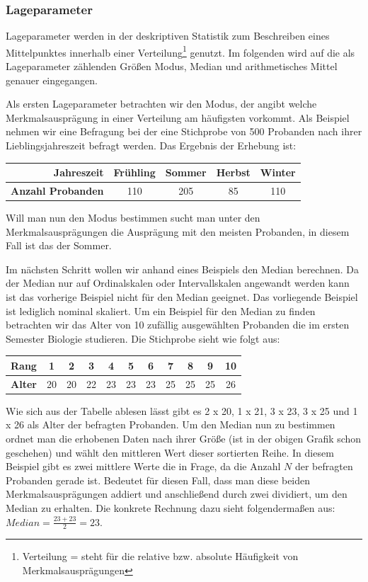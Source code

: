 \subsubsection{Lageparameter}
Lageparameter werden in der deskriptiven Statistik zum Beschreiben eines Mittelpunktes innerhalb einer Verteilung\footnote{Verteilung = steht für die relative bzw. absolute Häufigkeit von Merkmalsausprägungen} genutzt. Im folgenden wird auf die als Lageparameter zählenden Größen Modus, Median und arithmetisches Mittel genauer eingegangen.

Als ersten Lageparameter betrachten wir den Modus, der angibt welche Merkmalsausprägung in einer Verteilung am häufigsten vorkommt. Als Beispiel nehmen wir eine Befragung bei der eine Stichprobe von 500 Probanden nach ihrer Lieblingsjahreszeit befragt werden. Das Ergebnis der Erhebung ist:
\begin{center}
\begin{tabular}{r|c|c|c|c} 
\textbf{Jahreszeit} & Frühling & Sommer & Herbst & Winter \\ \hline
\textbf{Anzahl Probanden} & 110 & 205 & 85 & 110\\
\end{tabular}
\end{center}
Will man nun den Modus bestimmen sucht man unter den Merkmalsausprägungen die Ausprägung mit den meisten Probanden, in diesem Fall ist das der Sommer.

Im nächsten Schritt wollen wir anhand eines Beispiels den Median berechnen. Da der Median nur auf Ordinalskalen oder Intervallskalen angewandt werden kann ist das vorherige Beispiel nicht für den Median geeignet. Das vorliegende Beispiel ist lediglich nominal skaliert.
Um ein Beispiel für den Median zu finden betrachten wir das Alter von 10 zufällig ausgewählten Probanden die im ersten Semester Biologie studieren. Die Stichprobe sieht wie folgt aus:
\begin{center}
\begin{tabular}{r|c|c|c|c|c|c|c|c|c|c} 
\textbf{Rang} & 1 & 2 & 3 & 4 & 5 & 6 & 7 & 8 & 9 & 10 \\ \hline
\textbf{Alter} & 20 & 20 & 22 & 23 & 23 & 23 & 25 & 25 & 25 & 26\\
\end{tabular}
\end{center}
Wie sich aus der Tabelle ablesen lässt gibt es 2 x 20, 1 x 21, 3 x 23, 3 x 25 und 1 x 26 als Alter der befragten Probanden. Um den Median nun zu bestimmen ordnet man die erhobenen Daten nach ihrer Größe (ist in der obigen Grafik schon geschehen) und wählt den mittleren Wert dieser sortierten Reihe. In diesem Beispiel gibt es zwei mittlere Werte die in Frage, da die Anzahl $N$ der befragten Probanden gerade ist. Bedeutet für diesen Fall, dass man diese beiden Merkmalsausprägungen addiert und anschließend durch zwei dividiert, um den Median zu erhalten. Die konkrete Rechnung dazu sieht folgendermaßen aus: $Median = \frac{23 + 23}{2} = 23$.

